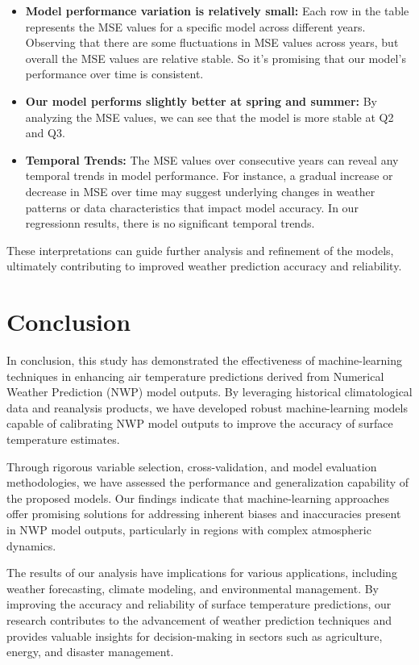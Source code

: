 \documentclass[12pt]{article}
\begin{document}
\begin{itemize}
\item \textbf{Model performance variation is relatively small:} Each row in the table represents the MSE values for a specific model across different years. Observing that there are some fluctuations in MSE values across years, but overall the MSE values are relative stable. So it's promising that our model's performance over time is consistent.

\item \textbf{Our model performs slightly better at spring and summer:} By analyzing the MSE values, we can see that the model is more stable at Q2 and Q3.

\item \textbf{Temporal Trends:} The MSE values over consecutive years can reveal any temporal trends in model performance. For instance, a gradual increase or decrease in MSE over time may suggest underlying changes in weather patterns or data characteristics that impact model accuracy. In our regressionn results, there is no significant temporal trends.

\end{itemize}


These interpretations can guide further analysis and refinement of the models, ultimately contributing to improved weather prediction accuracy and reliability.


\section{Conclusion}

In conclusion, this study has demonstrated the effectiveness of machine-learning techniques in enhancing air temperature predictions derived from Numerical Weather Prediction (NWP) model outputs. By leveraging historical climatological data and reanalysis products, we have developed robust machine-learning models capable of calibrating NWP model outputs to improve the accuracy of surface temperature estimates.

Through rigorous variable selection, cross-validation, and model evaluation methodologies, we have assessed the performance and generalization capability of the proposed models. Our findings indicate that machine-learning approaches offer promising solutions for addressing inherent biases and inaccuracies present in NWP model outputs, particularly in regions with complex atmospheric dynamics.

The results of our analysis have implications for various applications, including weather forecasting, climate modeling, and environmental management. By improving the accuracy and reliability of surface temperature predictions, our research contributes to the advancement of weather prediction techniques and provides valuable insights for decision-making in sectors such as agriculture, energy, and disaster management.
\end{document}
